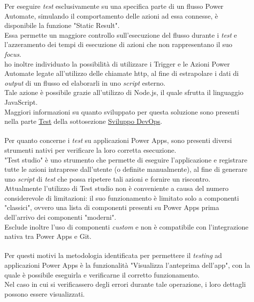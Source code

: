 \newpage \noindent Per eseguire \emph{test} esclusivamente su una specifica parte di un flusso Power Automate, simulando il comportamento delle azioni ad essa connesse, è disponibile la funzione "Static Result".\\
Essa permette un maggiore controllo sull'esecuzione del flusso durante i \emph{test} e l'azzeramento dei tempi di esecuzione di azioni che non rappresentano il suo \emph{focus}.\\
ho inoltre individuato la possibilità di utilizzare i Trigger e le Azioni Power Automate legate all'utilizzo delle chiamate \gls{http}, al fine di estrapolare i dati di \emph{output} di un flusso ed elaborarli in uno \emph{script} esterno.\\
Tale azione è possibile grazie all'utilizzo di Node.js, il quale sfrutta il linguaggio JavaScript.\\
Maggiori informazioni su quanto sviluppato per questa soluzione sono presenti nella parte \hyperref[testProgrammazione]{Test} della sottosezione \hyperref[Sviluppo DevOps]{Sviluppo DevOps}.\\\\
Per quanto concerne i \emph{test} su applicazioni Power Apps, sono presenti diversi strumenti nativi per verificare la loro corretta esecuzione.\\
"Test studio" è uno strumento che permette di eseguire l'applicazione e registrare tutte le azioni intraprese dall'utente (o definite manualmente), al fine di generare uno \emph{script} di \emph{test} che possa ripetere tali azioni e fornire un riscontro.\\
Attualmente l'utilizzo di Test studio non è conveniente a causa del numero considerevole di limitazioni:
il suo funzionamento è limitato solo a componenti "classici", ovvero una lista di componenti presenti su Power Apps prima dell'arrivo dei componenti "moderni".\\
Esclude inoltre l'uso di componenti \emph{custom} e non è compatibile con l'integrazione nativa tra Power Apps e Git.\\\\
Per questi motivi la metodologia identificata per permettere il \emph{testing} ad applicazioni Power Apps è la funzionalità "Visualizza l'anteprima dell'app", con la quale è possibile eseguirla e verificarne il corretto funzionamento.\\
Nel caso in cui si verificassero degli errori durante tale operazione, i loro dettagli possono essere visualizzati. 



